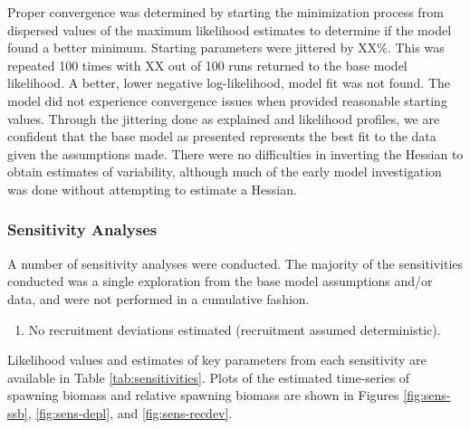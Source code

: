 \documentclass[11pt,
  english,
  a4paper,
]{article}
\begin{document}
\leavevmode\tagmcend\tagstructend


Proper convergence was determined by starting the minimization process from dispersed values of the maximum likelihood estimates to determine if the model found a better minimum. Starting parameters were jittered by XX\%. This was repeated 100 times with XX out of 100 runs returned to the base model likelihood. A better, lower negative log-likelihood, model fit was not found. The model did not experience convergence issues when provided reasonable starting values. Through the jittering done as explained and likelihood profiles, we are confident that the base model as presented represents the best fit to the data given the assumptions made. There were no difficulties in inverting the Hessian to obtain estimates of variability, although much of the early model investigation was done without attempting to estimate a Hessian.

\leavevmode\tagmcend\tagstructend\par


\hypertarget{sensitivity-analyses}{%
\subsubsection{Sensitivity Analyses}\label{sensitivity-analyses}}

\leavevmode\tagmcend\tagstructend


A number of sensitivity analyses were conducted. The majority of the sensitivities conducted was a single exploration from the base model assumptions and/or data, and were not performed in a cumulative fashion.

\leavevmode\tagmcend\tagstructend\par

\begin{enumerate} 

    \item No recruitment deviations estimated (recruitment assumed deterministic).

\end{enumerate}


Likelihood values and estimates of key parameters from each sensitivity are available in Table \ref{tab:sensitivities}. Plots of the estimated time-series of spawning biomass and relative spawning biomass are shown in Figures \ref{fig:sens-ssb}, \ref{fig:sens-depl}, and \ref{fig:sens-recdev}.
\end{document}
